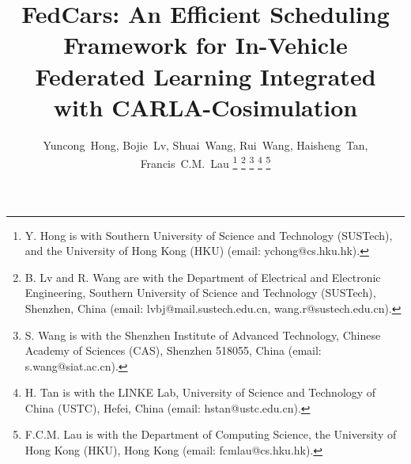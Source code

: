 \documentclass[conference]{IEEEtran} %
\theoremstyle{definition}             %
\theoremstyle{remark}                 %
\theoremstyle{plain}                  %
\newcommand{\fwName}{FedCars}
\begin{document}
    \title{
      {\fwName}: An Efficient Scheduling Framework for In-Vehicle Federated Learning 
      Integrated with CARLA-Cosimulation
    }
    \author{
        Yuncong~Hong,
        Bojie~Lv,
        Shuai~Wang,
        Rui~Wang,
        Haisheng~Tan,
        Francis~C.M.~Lau
        \thanks{
          Y. Hong is with Southern University of Science and Technology (SUSTech), and the University of Hong Kong (HKU) (email: ychong@cs.hku.hk).
        }
        \thanks{
          B. Lv and R. Wang are with the Department of Electrical and Electronic Engineering, Southern University of Science and Technology (SUSTech), Shenzhen, China (email: lvbj@mail.sustech.edu.cn, wang.r@sustech.edu.cn).
        }
        \thanks{
          S. Wang is with the Shenzhen Institute of Advanced Technology, Chinese Academy of Sciences (CAS), Shenzhen 518055, China (email: s.wang@siat.ac.cn).
        }
        \thanks{
          H. Tan is with the LINKE Lab,  University of Science and Technology of China (USTC), Hefei, China (email: hstan@ustc.edu.cn).
        }%
        \thanks{
          F.C.M. Lau is with the Department of Computing Science, the University of Hong Kong (HKU), Hong Kong (email: fcmlau@cs.hku.hk).
        }%
    }

    \maketitle
    

    
    
    
    
    
    

    \ifCLASSOPTIONcaptionsoff
        \newpage
    \fi

    
    
\end{document}
